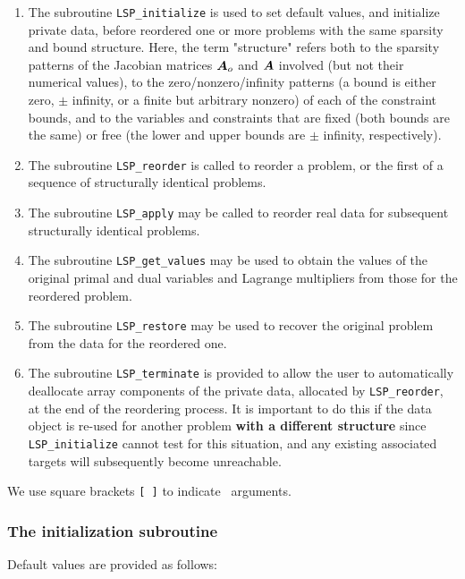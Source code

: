 \documentclass{galahad}
\newcommand{\packagename}{LSP}
\begin{document}
\begin{enumerate}
\item The subroutine 
  {\tt \packagename\_initialize} 
  is used to set default 
  values, and initialize private data, before reordered one or more problems 
  with the same sparsity and bound structure. 
  Here, the term "structure" refers both to 
  the sparsity patterns of the Jacobian matrices ${\bm{A}}_o$  and ${\bm{A}}$ 
  involved 
  (but not their numerical values), to the zero/nonzero/infinity patterns 
  (a bound is either zero, $\pm$ infinity, or a finite but arbitrary 
  nonzero) of each of the constraint bounds, and to the variables and 
  constraints that are fixed (both bounds are the same) or free 
  (the lower and upper bounds are $\pm$ infinity, respectively). 
 
\item The subroutine 
  {\tt \packagename\_reorder} 
  is called to reorder a problem, or the first of a sequence of structurally 
  identical problems. 
 
\item The subroutine 
  {\tt \packagename\_apply} 
  may be called to reorder real data for subsequent structurally identical 
  problems. 
 
\item The subroutine 
  {\tt \packagename\_get\_values} 
  may be used to obtain the values of the original primal and dual variables 
  and Lagrange multipliers from those for the reordered problem. 
 
\item The subroutine {\tt \packagename\_restore} may be used to recover the 
  original problem from the data for the reordered one. 
 
\item The subroutine 
  {\tt \packagename\_terminate} 
  is provided to allow the user to automatically deallocate array components 
  of the private data,  allocated by 
  {\tt \packagename\_reorder}, 
  at the end of the reordering process. It is important to do this if the data 
  object is re-used for another problem {\bf with a different structure} 
  since {\tt \packagename\_initialize} cannot test for this situation, 
  and any existing associated targets will subsequently become unreachable. 
\end{enumerate}
We use square brackets {\tt [ ]} to indicate \optional\ arguments.


\subsubsection{The initialization subroutine}\label{subinit}
 Default values are provided as follows:
\vspace*{1mm}
\end{document}
